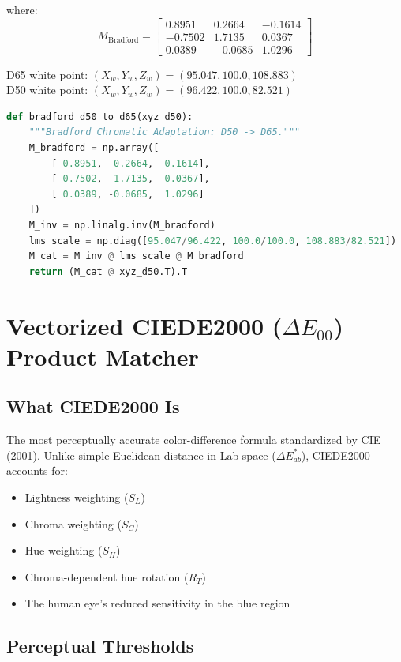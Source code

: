 \documentclass[12pt,a4paper]{article}
\begin{document}
where:
\begin{equation}
M_{\text{Bradford}} = \begin{bmatrix}
0.8951 & 0.2664 & -0.1614 \\
-0.7502 & 1.7135 & 0.0367 \\
0.0389 & -0.0685 & 1.0296
\end{bmatrix}
\end{equation}

D65 white point: $(X_w, Y_w, Z_w) = (95.047, 100.0, 108.883)$\\
D50 white point: $(X_w, Y_w, Z_w) = (96.422, 100.0, 82.521)$

\begin{lstlisting}[language=Python, caption={Bradford D50 $\to$ D65 Adaptation}]
def bradford_d50_to_d65(xyz_d50):
    """Bradford Chromatic Adaptation: D50 -> D65."""
    M_bradford = np.array([
        [ 0.8951,  0.2664, -0.1614],
        [-0.7502,  1.7135,  0.0367],
        [ 0.0389, -0.0685,  1.0296]
    ])
    M_inv = np.linalg.inv(M_bradford)
    lms_scale = np.diag([95.047/96.422, 100.0/100.0, 108.883/82.521])
    M_cat = M_inv @ lms_scale @ M_bradford
    return (M_cat @ xyz_d50.T).T
\end{lstlisting}


\section{Vectorized CIEDE2000 ($\Delta E_{00}$) Product Matcher}

\subsection{What CIEDE2000 Is}
The most perceptually accurate color-difference formula standardized by CIE (2001). Unlike simple Euclidean distance in Lab space ($\Delta E_{ab}^*$), CIEDE2000 accounts for:
\begin{itemize}
    \item Lightness weighting ($S_L$)
    \item Chroma weighting ($S_C$)
    \item Hue weighting ($S_H$)
    \item Chroma-dependent hue rotation ($R_T$)
    \item The human eye's reduced sensitivity in the blue region
\end{itemize}

\subsection{Perceptual Thresholds}
\end{document}
